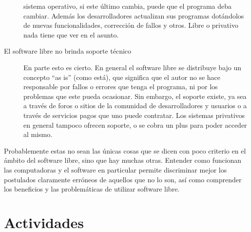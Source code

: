 \begin{description}
        sistema operativo, si este último cambia, puede que el programa deba
        cambiar. Además los desarrolladores actualizan sus programas dotándolos
        de nuevas funcionalidades, corrección de fallos y otros. Libre o
        privativo nada tiene que ver en el asunto.
    \item[El software libre no brinda soporte técnico]
        En parte esto es cierto. En general el software libre se distribuye
        bajo un concepto ``as is'' (como está), que significa que el autor
        no se hace responsable por fallos o errores que tenga el programa,
        ni por los problemas que este pueda ocasionar. Sin embargo, el soporte
        existe, ya sea a través de foros o sitios de la comunidad de desarrolladores
        y usuarios o a través de servicios pagos que uno puede contratar. Los
        sistemas privativos en general tampoco ofrecen soporte, o se cobra un
        plus para poder acceder al mismo.
\end{description}

Probablemente estas no sean las únicas cosas que se dicen con poco criterio en
el ámbito del software libre, sino que hay muchas otras. Entender como funcionan
las computadoras y el software en particular permite discriminar mejor los
postulados claramente erróneos de aquellos que no lo son, así como comprender
los beneficios y las problemáticas de utilizar software libre.

\section{Actividades}

